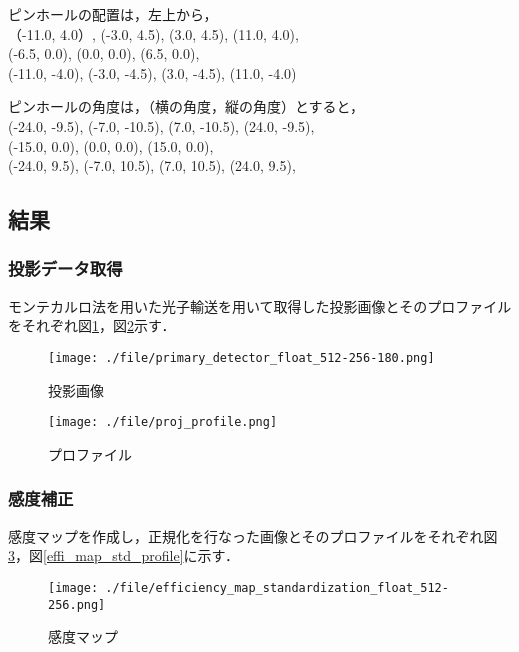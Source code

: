 \documentclass[dvipdfmx,autodetect-engine,twocolumn,10pt]{jsarticle}%
\begin{document}
ピンホールの配置は，左上から，\\
（-11.0, 4.0）, (-3.0, 4.5), (3.0, 4.5), (11.0, 4.0),\\
 (-6.5, 0.0), (0.0, 0.0), (6.5, 0.0), \\
 (-11.0, -4.0), (-3.0, -4.5), (3.0, -4.5), (11.0, -4.0)

ピンホールの角度は，（横の角度，縦の角度）とすると，\\
(-24.0, -9.5), (-7.0, -10.5), (7.0, -10.5), (24.0, -9.5), \\
(-15.0, 0.0), (0.0, 0.0), (15.0, 0.0),\\
(-24.0, 9.5), (-7.0, 10.5), (7.0, 10.5), (24.0, 9.5), \\


\subsection{結果}
\subsubsection{投影データ取得}
モンテカルロ法を用いた光子輸送を用いて取得した投影画像とそのプロファイルをそれぞれ図\ref{proj}，図\ref{proj_profile}示す．
\begin{figure}[htbp]
  \begin{center}
    \texttt{[image: ./file/primary\_detector\_float\_512-256-180.png]}\\
    \caption{投影画像}
    \label{proj}
  \end{center}
\end{figure}

\begin{figure}[htbp]
  \begin{center}
    \texttt{[image: ./file/proj\_profile.png]}\\
    \caption{プロファイル}
    \label{proj_profile}
  \end{center}
\end{figure}

\subsubsection{感度補正}
感度マップを作成し，正規化を行なった画像とそのプロファイルをそれぞれ図\ref{effi_map_std}，図\ref{effi_map_std_profile}に示す．

\begin{figure}[htbp]
  \begin{center}
    \texttt{[image: ./file/efficiency\_map\_standardization\_float\_512-256.png]}\\
    \caption{感度マップ}
    \label{effi_map_std}
  \end{center}
\end{figure}
\end{document}
